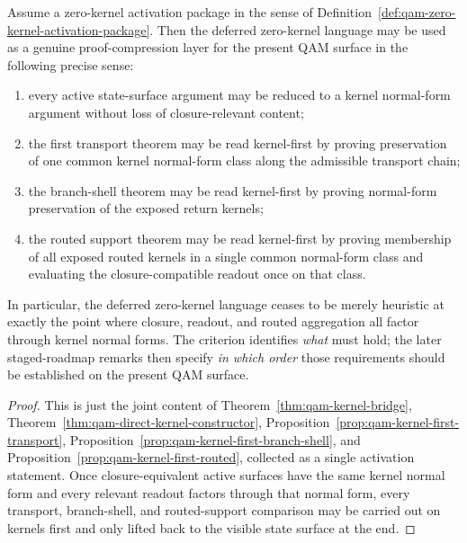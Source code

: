 \begin{theorem}\label{thm:qam-zero-kernel-activation-criterion}
Assume a zero-kernel activation package in the sense of Definition~\ref{def:qam-zero-kernel-activation-package}. Then the deferred zero-kernel language may be used as a genuine proof-compression layer for the present QAM surface in the following precise sense:
\begin{enumerate}[label=(\alph*)]
\item every active state-surface argument may be reduced to a kernel normal-form argument without loss of closure-relevant content;
\item the first transport theorem may be read kernel-first by proving preservation of one common kernel normal-form class along the admissible transport chain;
\item the branch-shell theorem may be read kernel-first by proving normal-form preservation of the exposed return kernels;
\item the routed support theorem may be read kernel-first by proving membership of all exposed routed kernels in a single common normal-form class and evaluating the closure-compatible readout once on that class.
\end{enumerate}
In particular, the deferred zero-kernel language ceases to be merely heuristic at exactly the point where closure, readout, and routed aggregation all factor through kernel normal forms. The criterion identifies \emph{what} must hold; the later staged-roadmap remarks then specify \emph{in which order} those requirements should be established on the present QAM surface.
\end{theorem}

\begin{proof}
This is just the joint content of Theorem~\ref{thm:qam-kernel-bridge}, Theorem~\ref{thm:qam-direct-kernel-constructor}, Proposition~\ref{prop:qam-kernel-first-transport}, Proposition~\ref{prop:qam-kernel-first-branch-shell}, and Proposition~\ref{prop:qam-kernel-first-routed}, collected as a single activation statement. Once closure-equivalent active surfaces have the same kernel normal form and every relevant readout factors through that normal form, every transport, branch-shell, and routed-support comparison may be carried out on kernels first and only lifted back to the visible state surface at the end.
\end{proof}

